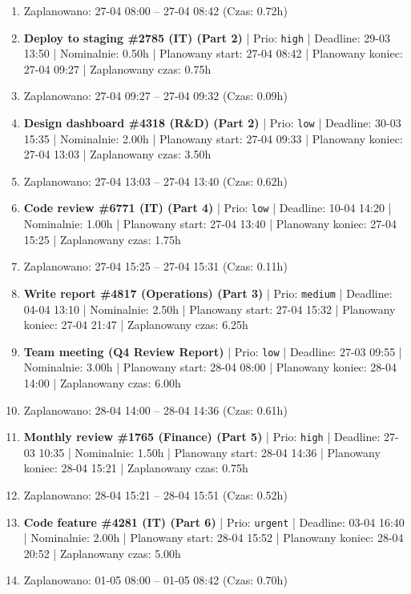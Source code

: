 {\begin{enumerate}
  \item [\textbf{PRZERWA}] Zaplanowano: 27-04 08:00 -- 27-04 08:42 (Czas: 0.72h)
  \item [\textbf{14623}] \textbf{Deploy to staging \#2785 (IT) (Part 2)} | Prio: \texttt{high} | Deadline: 29-03 13:50 | Nominalnie: 0.50h | Planowany start: 27-04 08:42 | Planowany koniec: 27-04 09:27 | Zaplanowany czas: 0.75h
  \item [\textbf{PRZERWA}] Zaplanowano: 27-04 09:27 -- 27-04 09:32 (Czas: 0.09h)
  \item [\textbf{14691}] \textbf{Design dashboard \#4318 (R\&D) (Part 2)} | Prio: \texttt{low} | Deadline: 30-03 15:35 | Nominalnie: 2.00h | Planowany start: 27-04 09:33 | Planowany koniec: 27-04 13:03 | Zaplanowany czas: 3.50h
  \item [\textbf{PRZERWA}] Zaplanowano: 27-04 13:03 -- 27-04 13:40 (Czas: 0.62h)
  \item [\textbf{14681}] \textbf{Code review \#6771 (IT) (Part 4)} | Prio: \texttt{low} | Deadline: 10-04 14:20 | Nominalnie: 1.00h | Planowany start: 27-04 13:40 | Planowany koniec: 27-04 15:25 | Zaplanowany czas: 1.75h
  \item [\textbf{PRZERWA}] Zaplanowano: 27-04 15:25 -- 27-04 15:31 (Czas: 0.11h)
  \item [\textbf{14639}] \textbf{Write report \#4817 (Operations) (Part 3)} | Prio: \texttt{medium} | Deadline: 04-04 13:10 | Nominalnie: 2.50h | Planowany start: 27-04 15:32 | Planowany koniec: 27-04 21:47 | Zaplanowany czas: 6.25h
  \item [\textbf{14682}] \textbf{Team meeting (Q4 Review Report)} | Prio: \texttt{low} | Deadline: 27-03 09:55 | Nominalnie: 3.00h | Planowany start: 28-04 08:00 | Planowany koniec: 28-04 14:00 | Zaplanowany czas: 6.00h
  \item [\textbf{PRZERWA}] Zaplanowano: 28-04 14:00 -- 28-04 14:36 (Czas: 0.61h)
  \item [\textbf{14627}] \textbf{Monthly review \#1765 (Finance) (Part 5)} | Prio: \texttt{high} | Deadline: 27-03 10:35 | Nominalnie: 1.50h | Planowany start: 28-04 14:36 | Planowany koniec: 28-04 15:21 | Zaplanowany czas: 0.75h
  \item [\textbf{PRZERWA}] Zaplanowano: 28-04 15:21 -- 28-04 15:51 (Czas: 0.52h)
  \item [\textbf{14604}] \textbf{Code feature \#4281 (IT) (Part 6)} | Prio: \texttt{urgent} | Deadline: 03-04 16:40 | Nominalnie: 2.00h | Planowany start: 28-04 15:52 | Planowany koniec: 28-04 20:52 | Zaplanowany czas: 5.00h
  \item [\textbf{PRZERWA}] Zaplanowano: 01-05 08:00 -- 01-05 08:42 (Czas: 0.70h)

\end{enumerate}}
